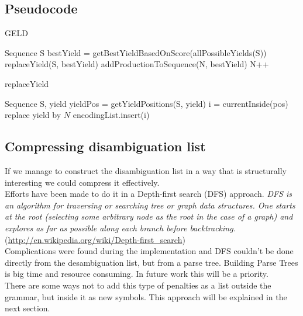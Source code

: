 	\subsection{Pseudocode}

	\begin{algorithm}
	\caption{GELD}
	\begin{algorithmic}[1]
	\REQUIRE Sequence S
	\STATE bestYield = getBestYieldBasedOnScore(allPossibleYields(S))
	\STATE replaceYield(S, bestYield)
	\STATE addProductionToSequence(N, bestYield) 
	\STATE N++
	\ENDWHILE

	\end{algorithmic}
	\end{algorithm}


	\begin{algorithm}
	\caption{replaceYield}
	\begin{algorithmic}[1]
	\REQUIRE Sequence S, yield
	\STATE yieldPos = getYieldPositions(S, yield)
	\FOR{pos in yieldPos}
		\STATE i = currentInside(pos)
		\STATE replace yield by $N$
		\STATE encodingList.insert(i) 
	\ENDFOR
	\end{algorithmic}
	\end{algorithm}




	\subsection{Compressing disambiguation list}

	If we manage to	construct the disambiguation list in a way that is structurally interesting we could
	compress it effectively. \\

	Efforts have been made to do it in a Depth-first search (DFS) approach. \emph{DFS is an algorithm for traversing or searching tree or graph data structures. One starts at the root (selecting some arbitrary node as the root in the case of a graph) and explores as far as possible along each branch before backtracking.}
	(\url{http://en.wikipedia.org/wiki/Depth-first_search}) \\

	Complications were found during the implementation and DFS couldn't be done directly from the desambiguation
 list, but from a parse tree. Building Parse Trees is big time and resource consuming. In future work this will be a priority. \\

	There are some ways not to add this type of penalties as a list outside the grammar,
	but inside it as new symbols. This approach will be explained in the next section. \\

